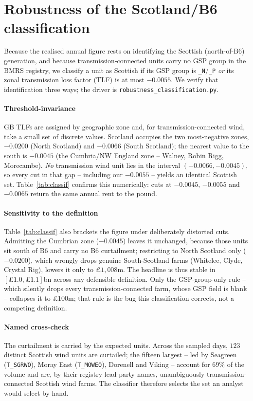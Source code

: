 \documentclass[review,3p,times]{elsarticle}
\theoremstyle{plain}
\theoremstyle{definition}
\begin{document}
\section{Robustness of the Scotland/B6 classification}\label{app:classif}

Because the realised annual figure rests on identifying the Scottish
(north-of-B6) generation, and because transmission-connected units carry no GSP
group in the BMRS registry, we classify a unit as Scottish if its GSP group is
\texttt{\_N}/\texttt{\_P} \emph{or} its zonal transmission loss factor (TLF) is at
most $-0.0055$. We verify that identification three ways; the driver is
\texttt{robustness\_classification.py}.

\paragraph{Threshold-invariance} GB TLFs are assigned by geographic zone and, for
transmission-connected wind, take a small set of discrete values. Scotland
occupies the two most-negative zones, $-0.0200$ (North Scotland) and $-0.0066$
(South Scotland); the nearest value to the south is $-0.0045$ (the Cumbria/NW
England zone -- Walney, Robin Rigg, Morecambe). \emph{No} transmission wind unit
lies in the interval $(-0.0066,-0.0045)$, so every cut in that gap -- including our
$-0.0055$ -- yields an identical Scottish set. Table~\ref{tab:classif} confirms
this numerically: cuts at $-0.0045$, $-0.0055$ and $-0.0065$ return the same
annual rent to the pound.

\paragraph{Sensitivity to the definition} Table~\ref{tab:classif} also brackets
the figure under deliberately distorted cuts. Admitting the Cumbrian zone
($-0.0045$) leaves it unchanged, because those units sit south of B6 and carry no
B6 curtailment; restricting to North Scotland only ($-0.0200$), which wrongly
drops genuine South-Scotland farms (Whitelee, Clyde, Crystal Rig), lowers it only
to $\pounds1{,}008$m. The headline is thus stable in $[\pounds1.0,\pounds1.1]$bn
across any defensible definition. Only the GSP-group-only rule -- which silently
drops every transmission-connected farm, whose GSP field is blank -- collapses it
to $\pounds100$m; that rule is the bug this classification corrects, not a
competing definition.

\paragraph{Named cross-check} The curtailment is carried by the expected units.
Across the sampled days, $123$ distinct Scottish wind units are curtailed; the
fifteen largest -- led by Seagreen (\texttt{T\_SGRWO}), Moray East
(\texttt{T\_MOWEO}), Dorenell and Viking -- account for $69\%$ of the volume and
are, by their registry lead-party names, unambiguously transmission-connected
Scottish wind farms. The classifier therefore selects the set an analyst would
select by hand.
\end{document}
